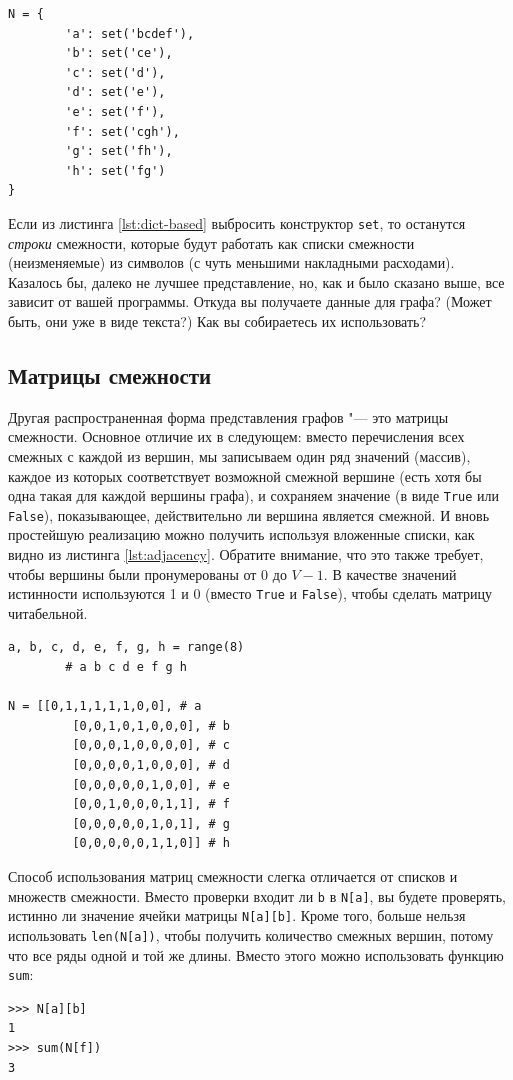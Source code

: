 \begin{lstlisting}[caption={Словарь с множествами смежности}, label={lst:dict-based}]
N = {
		'a': set('bcdef'),
		'b': set('ce'),
		'c': set('d'),
		'd': set('e'),
		'e': set('f'),
		'f': set('cgh'),
		'g': set('fh'),
		'h': set('fg')
}
\end{lstlisting}

\begin{note}
Если из листинга \ref{lst:dict-based} выбросить конструктор \texttt{set}, то останутся \textit{строки} смежности, которые будут работать как списки смежности (неизменяемые) из символов (с чуть меньшими накладными расходами). Казалось бы, далеко не лучшее представление, но, как и было сказано выше, все зависит от вашей программы. Откуда вы получаете данные для графа? (Может быть, они уже в виде текста?) Как вы собираетесь их использовать?
\end{note}

\subsection{Матрицы смежности}
\label{sec:adjacency-matrix}

Другая распространенная форма представления графов "--- это матрицы смежности. Основное отличие их в следующем: вместо перечисления всех смежных с каждой из вершин, мы записываем один ряд значений (массив), каждое из которых соответствует возможной смежной вершине (есть хотя бы одна такая для каждой вершины графа), и сохраняем значение (в виде \texttt{True} или \texttt{False}), показывающее, действительно ли вершина является смежной. И вновь простейшую реализацию можно получить используя вложенные списки, как видно из листинга \ref{lst:adjacency}. Обратите внимание, что это также требует, чтобы вершины были пронумерованы от $0$ до $V-1$. В качестве значений истинности используются 1 и 0 (вместо \texttt{True} и \texttt{False}), чтобы сделать матрицу читабельной.

\begin{lstlisting}[caption={Матрица смежности, реализованная с помощью вложенных списков},label={lst:adjacency}]
a, b, c, d, e, f, g, h = range(8)
	    # a b c d e f g h

N = [[0,1,1,1,1,1,0,0], # a
		 [0,0,1,0,1,0,0,0], # b
		 [0,0,0,1,0,0,0,0], # c
		 [0,0,0,0,1,0,0,0], # d
		 [0,0,0,0,0,1,0,0], # e
		 [0,0,1,0,0,0,1,1], # f
		 [0,0,0,0,0,1,0,1], # g
		 [0,0,0,0,0,1,1,0]] # h
\end{lstlisting}

Способ использования матриц смежности слегка отличается от списков и множеств смежности. Вместо проверки входит ли \texttt{b} в \texttt{N[a]}, вы будете проверять, истинно ли значение ячейки матрицы \texttt{N[a][b]}. Кроме того, больше нельзя использовать \texttt{len(N[a])}, чтобы получить количество смежных вершин, потому что все ряды одной и той же длины. Вместо этого можно использовать функцию \texttt{sum}:\begin{lstlisting}
>>> N[a][b]
1
>>> sum(N[f])
3
\end{lstlisting}

